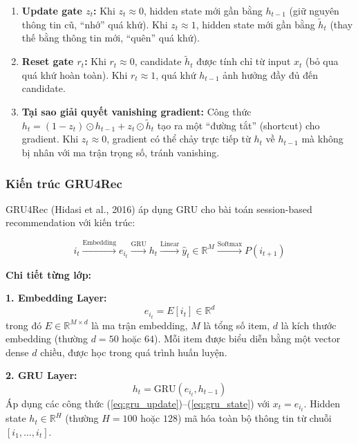 \documentclass[12pt, a4paper]{article}
\begin{document}
\begin{enumerate}
    \item \textbf{Update gate $z_t$:} Khi $z_t \approx 0$, hidden state mới gần bằng $h_{t-1}$ (giữ nguyên thông tin cũ, ``nhớ'' quá khứ). Khi $z_t \approx 1$, hidden state mới gần bằng $\tilde{h}_t$ (thay thế bằng thông tin mới, ``quên'' quá khứ).
    
    \item \textbf{Reset gate $r_t$:} Khi $r_t \approx 0$, candidate $\tilde{h}_t$ được tính chỉ từ input $x_t$ (bỏ qua quá khứ hoàn toàn). Khi $r_t \approx 1$, quá khứ $h_{t-1}$ ảnh hưởng đầy đủ đến candidate.
    
    \item \textbf{Tại sao giải quyết vanishing gradient:} Công thức $h_t = (1-z_t) \odot h_{t-1} + z_t \odot \tilde{h}_t$ tạo ra một ``đường tắt'' (shortcut) cho gradient. Khi $z_t \approx 0$, gradient có thể chảy trực tiếp từ $h_t$ về $h_{t-1}$ mà không bị nhân với ma trận trọng số, tránh vanishing.
\end{enumerate}

\subsubsection{Kiến trúc GRU4Rec}

GRU4Rec (Hidasi et al., 2016) \cite{hidasi2016} áp dụng GRU cho bài toán session-based recommendation với kiến trúc:

\begin{equation}
    i_t \xrightarrow{\text{Embedding}} e_{i_t} \xrightarrow{\text{GRU}} h_t \xrightarrow{\text{Linear}} \hat{y}_t \in \mathbb{R}^M \xrightarrow{\text{Softmax}} P(i_{t+1})
    \label{eq:gru4rec_pipeline}
\end{equation}

\textbf{Chi tiết từng lớp:}

\textbf{1. Embedding Layer:}
\begin{equation}
    e_{i_t} = E[i_t] \in \mathbb{R}^d
    \label{eq:embedding}
\end{equation}
trong đó $E \in \mathbb{R}^{M \times d}$ là ma trận embedding, $M$ là tổng số item, $d$ là kích thước embedding (thường $d = 50$ hoặc $64$). Mỗi item được biểu diễn bằng một vector dense $d$ chiều, được học trong quá trình huấn luyện.

\textbf{2. GRU Layer:}
\begin{equation}
    h_t = \text{GRU}(e_{i_t}, h_{t-1})
    \label{eq:gru_layer}
\end{equation}
Áp dụng các công thức (\ref{eq:gru_update})--(\ref{eq:gru_state}) với $x_t = e_{i_t}$. Hidden state $h_t \in \mathbb{R}^H$ (thường $H = 100$ hoặc $128$) mã hóa toàn bộ thông tin từ chuỗi $[i_1, \ldots, i_t]$.
\end{document}
